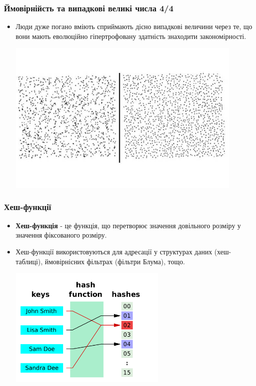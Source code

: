 \documentclass{beamer}
\begin{document}
\begin{frame}[fragile]
  \frametitle{Ймовірнійсть та випадкові великі числа 4/4}
  \begin{itemize}
  \item Люди дуже погано вміють сприймають дісно випадкові величини через те, що
    вони мають еволюційно гіпертрофовану здатність знаходити закономірності.
    \begin{center}
      \includegraphics[width=0.9\textwidth,]{random_dots}
    \end{center}
  \end{itemize}
\end{frame}

\begin{frame}
  \frametitle{Хеш-функції}
  \begin{itemize}
  \item \textbf{Хеш-функція} - це функція, що перетворює значення довільного
    розміру у значення фіксованого розміру.
  \item Хеш-функції використовуються для адресації у структурах даних (хеш-таблиці),
    ймовірнісних фільтрах (фільтри Блума), тощо.
    \begin{center}
      \includegraphics[width=0.6\textwidth,]{hash_function}
    \end{center}
  \end{itemize}
\end{frame}
\end{document}
